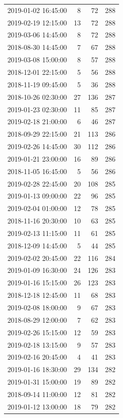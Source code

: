 \begin{tabular}{lrrr}
2019-01-02 16:45:00 & 8 & 72 & 288 \\
2019-02-19 12:15:00 & 13 & 72 & 288 \\
2019-03-06 14:45:00 & 8 & 72 & 288 \\
2018-08-30 14:45:00 & 7 & 67 & 288 \\
2019-03-08 15:00:00 & 8 & 57 & 288 \\
2018-12-01 22:15:00 & 5 & 56 & 288 \\
2018-11-19 09:45:00 & 5 & 36 & 288 \\
2018-10-26 02:30:00 & 27 & 136 & 287 \\
2019-01-23 02:30:00 & 11 & 85 & 287 \\
2019-02-18 21:00:00 & 6 & 46 & 287 \\
2018-09-29 22:15:00 & 21 & 113 & 286 \\
2019-02-26 14:45:00 & 30 & 112 & 286 \\
2019-01-21 23:00:00 & 16 & 89 & 286 \\
2018-11-05 16:45:00 & 5 & 56 & 286 \\
2019-02-28 22:45:00 & 20 & 108 & 285 \\
2019-01-13 09:00:00 & 22 & 96 & 285 \\
2019-02-04 01:00:00 & 12 & 78 & 285 \\
2018-11-16 20:30:00 & 10 & 63 & 285 \\
2019-02-13 11:15:00 & 11 & 61 & 285 \\
2018-12-09 14:45:00 & 5 & 44 & 285 \\
2019-02-02 20:45:00 & 22 & 116 & 284 \\
2019-01-09 16:30:00 & 24 & 126 & 283 \\
2019-01-16 15:15:00 & 26 & 123 & 283 \\
2018-12-18 12:45:00 & 11 & 68 & 283 \\
2019-02-08 18:00:00 & 9 & 67 & 283 \\
2018-08-29 12:00:00 & 7 & 62 & 283 \\
2019-02-26 15:15:00 & 12 & 59 & 283 \\
2019-02-18 13:15:00 & 9 & 57 & 283 \\
2019-02-16 20:45:00 & 4 & 41 & 283 \\
2019-01-16 18:30:00 & 29 & 134 & 282 \\
2019-01-31 15:00:00 & 19 & 89 & 282 \\
2018-09-14 11:00:00 & 12 & 81 & 282 \\
2019-01-12 13:00:00 & 18 & 79 & 282 \\

\end{tabular}
